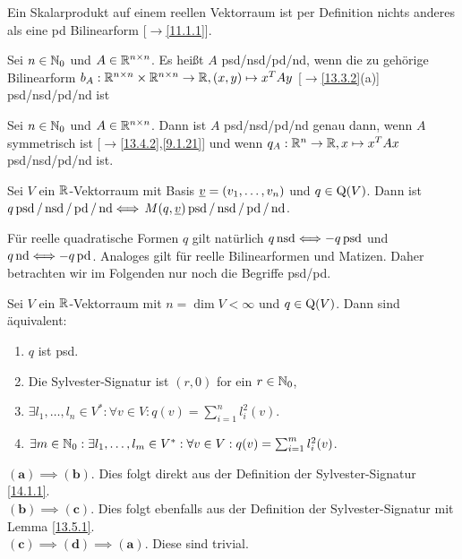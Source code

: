 \documentclass[../../main.tex]{subfiles}
\begin{document}
\begin{bsp}\label{14.2.2}
Ein Skalarprodukt auf einem reellen Vektorraum ist per Definition nichts anderes als eine pd Bilinearform [$\to$\ref{11.1.1}].
\end{bsp}
	
\begin{df}\label{14.2.3}
Sei $n\in \mathbb N_0$ und $A\in \mathbb R^{n\times n}$. Es heißt $A$ psd/nsd/pd/nd, wenn die zu gehörige Bilinearform $b_A: \mathbb R^{n\times n}\times \mathbb R^{n\times n}\to \mathbb R, (x,y)\mapsto x^TAy$ [$\to$\ref{13.3.2}(a)] psd/nsd/pd/nd ist
\end{df}

\begin{bem}\label{14.2.4}
Sei $n\in \mathbb N_0$ und $A\in \mathbb R^{n\times n}$. Dann ist $A$ psd/nsd/pd/nd genau dann, wenn $A$ symmetrisch ist [$\to$\ref{13.4.2},\ref{9.1.21}] und wenn $q_A: \mathbb R^n\to \mathbb R, x\mapsto x^TAx$ psd/nsd/pd/nd ist.
\end{bem}
	
\begin{bem}\label{14.2.5}
Sei $V$ ein $\mathbb R$-Vektorraum mit Basis ${\underline v}=(v_1,\ldots ,v_n)$ und $q\in\operatorname{Q}(V)$. Dann ist $q \operatorname{psd}/\operatorname{nsd}/\operatorname{pd}/\operatorname{nd} \Longleftrightarrow$ $M(q,{\underline v}) \operatorname{psd}/\operatorname{nsd}/\operatorname{pd}/\operatorname{nd}$.
\end{bem}

\begin{bem}\label{14.2.6}
Für reelle quadratische Formen $q$ gilt natürlich $q\operatorname{nsd}\Longleftrightarrow -q \operatorname{psd}$ und $q\operatorname{nd}\Longleftrightarrow -q \operatorname{pd}$. Analoges gilt für reelle Bilinearformen und Matizen. Daher betrachten wir im Folgenden nur noch die Begriffe psd/pd.
\end{bem}

\begin{sat}\label{14.2.7}
Sei $V$ ein $\mathbb R$-Vektorraum mit $n=\dim V<\infty$ und $q\in \operatorname{Q}(V)$. Dann sind äquivalent:
\begin{enumerate}[\normalfont(a)]
\item $q$ ist psd.
\item Die Sylvester-Signatur ist $(r,0)$ for ein $r\in \mathbb N_0$,
\item $\exists l_1,\ldots ,l_n\in V^*: \forall v\in V: q(v)=\sum_{i=1}^nl_i^2(v)$.
\item $\exists m\in \mathbb N_0:\exists l_1,\ldots ,l_m\in V^*: \forall v\in V: q(v)=\sum_{i=1}^ml_i^2(v)$.
\end{enumerate}
\end{sat}
\begin{cproof}
$\boldsymbol{(a)\implies(b)}$. Dies folgt direkt aus der Definition der Sylvester-Signatur \ref{14.1.1}.\\

\noindent$\boldsymbol{(b)\implies(c)}$. Dies folgt ebenfalls aus der Definition der Sylvester-Signatur mit Lemma \ref{13.5.1}.\\

\noindent $\boldsymbol{(c)\implies(d)\implies(a)}$. Diese sind trivial.
\end{cproof}
\end{document}
